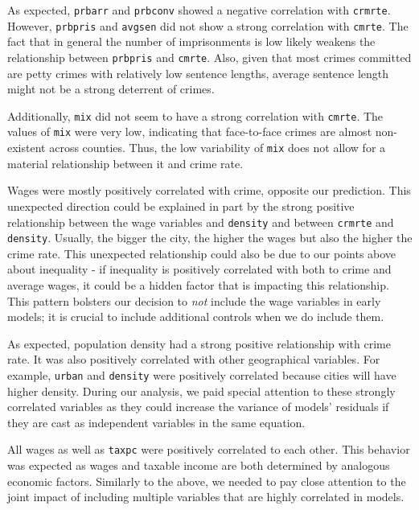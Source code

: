 \documentclass[]{article}
\newenvironment{Shaded}{\begin{snugshade}}{\end{snugshade}}
\newcommand{\CommentTok}[1]{\textcolor[rgb]{0.56,0.35,0.01}{\textit{#1}}}
\newcommand{\DataTypeTok}[1]{\textcolor[rgb]{0.13,0.29,0.53}{#1}}
\newcommand{\DecValTok}[1]{\textcolor[rgb]{0.00,0.00,0.81}{#1}}
\newcommand{\KeywordTok}[1]{\textcolor[rgb]{0.13,0.29,0.53}{\textbf{#1}}}
\newcommand{\NormalTok}[1]{#1}
\newcommand{\OperatorTok}[1]{\textcolor[rgb]{0.81,0.36,0.00}{\textbf{#1}}}
\newcommand{\StringTok}[1]{\textcolor[rgb]{0.31,0.60,0.02}{#1}}
\begin{document}
As expected, \texttt{prbarr} and \texttt{prbconv} showed a negative
correlation with \texttt{crmrte}. However, \texttt{prbpris} and
\texttt{avgsen} did not show a strong correlation with \texttt{cmrte}.
The fact that in general the number of imprisonments is low likely
weakens the relationship between \texttt{prbpris} and \texttt{cmrte}.
Also, given that most crimes committed are petty crimes with relatively
low sentence lengths, average sentence length might not be a strong
deterrent of crimes.

Additionally, \texttt{mix} did not seem to have a strong correlation
with \texttt{cmrte}. The values of \texttt{mix} were very low,
indicating that face-to-face crimes are almost non-existent across
counties. Thus, the low variability of \texttt{mix} does not allow for a
material relationship between it and crime rate.

Wages were mostly positively correlated with crime, opposite our
prediction. This unexpected direction could be explained in part by the
strong positive relationship between the wage variables and
\texttt{density} and between \texttt{crmrte} and \texttt{density}.
Usually, the bigger the city, the higher the wages but also the higher
the crime rate. This unexpected relationship could also be due to our
points above about inequality - if inequality is positively correlated
with both to crime and average wages, it could be a hidden factor that
is impacting this relationship. This pattern bolsters our decision to
\emph{not} include the wage variables in early models; it is crucial to
include additional controls when we do include them.

As expected, population density had a strong positive relationship with
crime rate. It was also positively correlated with other geographical
variables. For example, \texttt{urban} and \texttt{density} were
positively correlated because cities will have higher density. During
our analysis, we paid special attention to these strongly correlated
variables as they could increase the variance of models' residuals if
they are cast as independent variables in the same equation.

All wages as well as \texttt{taxpc} were positively correlated to each
other. This behavior was expected as wages and taxable income are both
determined by analogous economic factors. Similarly to the above, we
needed to pay close attention to the joint impact of including multiple
variables that are highly correlated in models.

\begin{Shaded}
\end{Shaded}
\end{document}
